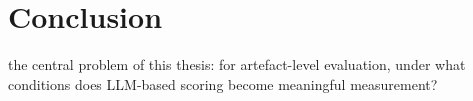 

\section{Conclusion}

the central problem of this thesis: for artefact-level evaluation, under what conditions does LLM-based scoring become meaningful measurement?